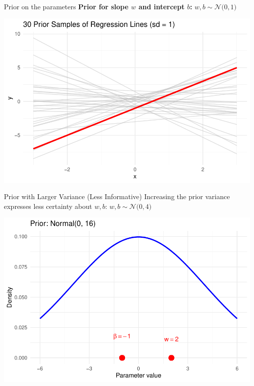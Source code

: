 \documentclass{beamer}
\begin{document}
\begin{frame}{Prior on the parameters}
  \textbf{Prior for slope \(w\) and intercept \(b\):}
  \(
    w, b \sim \mathcal{N}\big(0, 1\big)
  \)

  \begin{center}
    \includegraphics[width=0.8\linewidth]{prior_2_1.pdf}
  \end{center}
\end{frame}

\begin{frame}{Prior with Larger Variance (Less Informative)}
  Increasing the prior variance expresses less certainty about \(w, b\):
  \(
    w, b \sim \mathcal{N}\big(0, 4\big)
  \)

  \begin{center}
    \includegraphics[width=0.8\linewidth]{prior_1_2.pdf}
  \end{center}
\end{frame}
\end{document}

